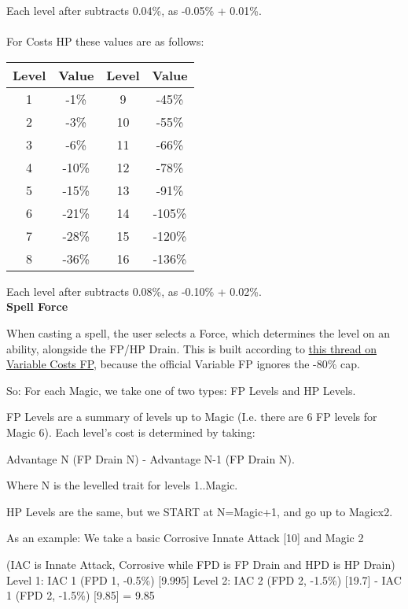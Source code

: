 \begin{multicols*}{2}
	Each level after subtracts 0.04\%, as -0.05\% + 0.01\%.
	\\\\
	For Costs HP these values are as follows:
	\begin{center}
		\begin{tabular}{|c|c|c|c|}
			\hline
			Level & Value & Level & Value \\
			\hline
			\hline
			1 & -1\% & 9 & -45\% \\
			2 & -3\% & 10 & -55\% \\
			3 & -6\% & 11 & -66\% \\
			4 & -10\% & 12 & -78\% \\
			5 & -15\% & 13 & -91\% \\
			6 & -21\% & 14 & -105\% \\
			7 & -28\% & 15 & -120\% \\
			8 & -36\% & 16 & -136\% \\
			\hline
		\end{tabular}
	\end{center}
	
	Each level after subtracts 0.08\%, as -0.10\% + 0.02\%.\\
	
	\textbf{Spell Force\label{Spell Force}}
	
	When casting a spell, the user selects a Force, which determines the level on an ability, alongside the FP/HP Drain. This is built according to \textcolor{Blue}{\href{http://forums.sjgames.com/showpost.php?p=1399558&postcount=27}{this thread on Variable Costs FP}}, because the official Variable FP ignores the -80\% cap.
	
	So: For each Magic, we take one of two types: FP Levels and HP Levels.
	
	FP Levels are a summary of levels up to Magic (I.e. there are 6 FP levels for Magic 6). Each level's cost is determined by taking:
	
	Advantage N (FP Drain N) - Advantage N-1 (FP Drain N).
	
	Where N is the levelled trait for levels 1..Magic.
	
	HP Levels are the same, but we START at N=Magic+1, and go up to Magicx2.
	
	As an example: We take a basic Corrosive Innate Attack [10] and Magic 2
	
	(IAC is Innate Attack, Corrosive while FPD is FP Drain and HPD is HP Drain)
	Level 1: IAC 1 (FPD 1, -0.5\%) [9.995]
	Level 2: IAC 2 (FPD 2, -1.5\%) [19.7] - IAC 1 (FPD 2, -1.5\%) [9.85] = 9.85
	

\end{multicols*}
